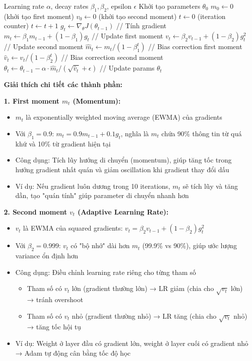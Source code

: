 \begin{algorithm}[H]
\caption{Adam Optimizer}
\begin{algorithmic}[1]
\REQUIRE Learning rate $\alpha$, decay rates $\beta_1, \beta_2$, epsilon $\epsilon$
\REQUIRE Khởi tạo parameters $\theta_0$
\STATE $m_0 \leftarrow 0$ (khởi tạo first moment)
\STATE $v_0 \leftarrow 0$ (khởi tạo second moment)
\STATE $t \leftarrow 0$ (iteration counter)
    \STATE $t \leftarrow t + 1$
    \STATE $g_t \leftarrow \nabla_\theta J(\theta_{t-1})$ \hfill // Tính gradient
    \STATE $m_t \leftarrow \beta_1 m_{t-1} + (1 - \beta_1) g_t$ \hfill // Update first moment
    \STATE $v_t \leftarrow \beta_2 v_{t-1} + (1 - \beta_2) g_t^2$ \hfill // Update second moment
    \STATE $\hat{m}_t \leftarrow m_t / (1 - \beta_1^t)$ \hfill // Bias correction first moment
    \STATE $\hat{v}_t \leftarrow v_t / (1 - \beta_2^t)$ \hfill // Bias correction second moment
    \STATE $\theta_t \leftarrow \theta_{t-1} - \alpha \cdot \hat{m}_t / (\sqrt{\hat{v}_t} + \epsilon)$ \hfill // Update params
\ENDWHILE
\RETURN $\theta_t$
\end{algorithmic}
\end{algorithm}

\textbf{Giải thích chi tiết các thành phần:}

\textbf{1. First moment $m_t$ (Momentum):}
\begin{itemize}[nosep]
\item $m_t$ là exponentially weighted moving average (EWMA) của gradients
\item Với $\beta_1 = 0.9$: $m_t = 0.9 m_{t-1} + 0.1 g_t$, nghĩa là $m_t$ chứa 90\% thông tin từ quá khứ và 10\% từ gradient hiện tại
\item Công dụng: Tích lũy hướng di chuyển (momentum), giúp tăng tốc trong hướng gradient nhất quán và giảm oscillation khi gradient thay đổi dấu
\item Ví dụ: Nếu gradient luôn dương trong 10 iterations, $m_t$ sẽ tích lũy và tăng dần, tạo "quán tính" giúp parameter di chuyển nhanh hơn
\end{itemize}

\textbf{2. Second moment $v_t$ (Adaptive Learning Rate):}
\begin{itemize}[nosep]
\item $v_t$ là EWMA của squared gradients: $v_t = \beta_2 v_{t-1} + (1-\beta_2) g_t^2$
\item Với $\beta_2 = 0.999$: $v_t$ có "bộ nhớ" dài hơn $m_t$ (99.9\% vs 90\%), giúp ước lượng variance ổn định hơn
\item Công dụng: Điều chỉnh learning rate riêng cho từng tham số
  \begin{itemize}[nosep]
  \item Tham số có $v_t$ lớn (gradient thường lớn) → LR giảm (chia cho $\sqrt{v_t}$ lớn) → tránh overshoot
  \item Tham số có $v_t$ nhỏ (gradient thường nhỏ) → LR tăng (chia cho $\sqrt{v_t}$ nhỏ) → tăng tốc hội tụ
  \end{itemize}
\item Ví dụ: Weight ở layer đầu có gradient lớn, weight ở layer cuối có gradient nhỏ → Adam tự động cân bằng tốc độ học
\end{itemize}

